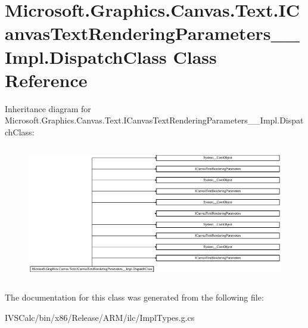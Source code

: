 \hypertarget{class_microsoft_1_1_graphics_1_1_canvas_1_1_text_1_1_i_canvas_text_rendering_parameters_____impl_1_1_dispatch_class}{}\section{Microsoft.\+Graphics.\+Canvas.\+Text.\+I\+Canvas\+Text\+Rendering\+Parameters\+\_\+\+\_\+\+Impl.\+Dispatch\+Class Class Reference}
\label{class_microsoft_1_1_graphics_1_1_canvas_1_1_text_1_1_i_canvas_text_rendering_parameters_____impl_1_1_dispatch_class}
Inheritance diagram for Microsoft.\+Graphics.\+Canvas.\+Text.\+I\+Canvas\+Text\+Rendering\+Parameters\+\_\+\+\_\+\+Impl.\+Dispatch\+Class\+:\begin{figure}[H]
\begin{center}
\leavevmode
\includegraphics[height=5.957447cm]{class_microsoft_1_1_graphics_1_1_canvas_1_1_text_1_1_i_canvas_text_rendering_parameters_____impl_1_1_dispatch_class}
\end{center}
\end{figure}


The documentation for this class was generated from the following file\+:\begin{DoxyCompactItemize}
\item 
I\+V\+S\+Calc/bin/x86/\+Release/\+A\+R\+M/ilc/Impl\+Types.\+g.\+cs\end{DoxyCompactItemize}

